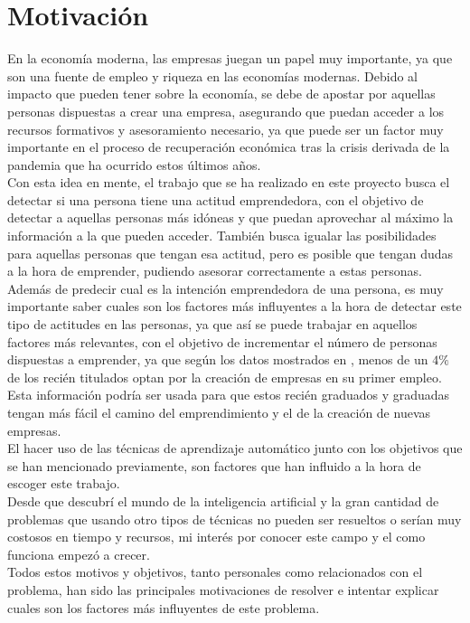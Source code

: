 \section{Motivación}
En la economía moderna, las empresas juegan un papel muy importante, ya que son una fuente de empleo y riqueza en las economías modernas. Debido al impacto que pueden tener sobre la economía, se debe de apostar por aquellas personas dispuestas a crear una empresa, asegurando que puedan acceder a los recursos formativos y asesoramiento necesario, ya que puede ser un factor muy importante en el proceso de recuperación económica tras la crisis derivada de la pandemia que ha ocurrido estos últimos años.\\
\linebreak
Con esta idea en mente, el trabajo que se ha realizado en este proyecto busca el detectar si una persona tiene una actitud emprendedora, con el objetivo de detectar a aquellas personas más idóneas y que puedan aprovechar al máximo la información a la que pueden acceder. También busca igualar las posibilidades para aquellas personas que tengan esa actitud, pero es posible que tengan dudas a la hora de emprender, pudiendo asesorar correctamente a estas personas.\\
\linebreak
Además de predecir cual es la intención emprendedora de una persona, es muy importante saber cuales son los factores más influyentes a la hora de detectar este tipo de actitudes en las personas, ya que así se puede trabajar en aquellos factores más relevantes, con el objetivo de incrementar el número de personas dispuestas a emprender, ya que según los datos mostrados en \cite{ie}, menos de un $4\%$ de los recién titulados optan por la creación de empresas en su primer empleo. Esta información podría ser usada para que estos recién graduados y graduadas tengan más fácil el camino del emprendimiento y el de la creación de nuevas empresas.\\
\linebreak
El hacer uso de las técnicas de aprendizaje automático junto con los objetivos que se han mencionado previamente, son factores que han influido a la hora de escoger este trabajo.\\
Desde que descubrí el mundo de la inteligencia artificial y la gran cantidad de problemas que usando otro tipos de técnicas no pueden ser resueltos o serían muy costosos en tiempo y recursos, mi interés por conocer este campo y el como funciona empezó a crecer.\\
\linebreak
Todos estos motivos y objetivos, tanto personales como relacionados con el problema, han sido las principales motivaciones de resolver e intentar explicar cuales son los factores más influyentes de este problema.
\clearpage
